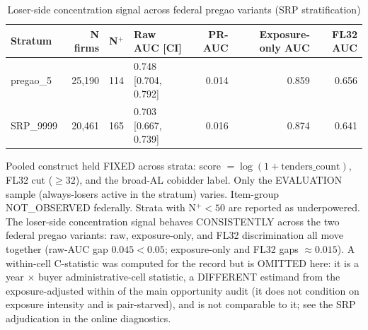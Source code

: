 \begin{table}[htbp]\centering
\caption{Loser-side concentration signal across federal pregao variants (SRP stratification)}
\label{tab:srp_stratified}
\begin{tabular}{lrrlrrr}\hline
Stratum & N firms & N$^+$ & Raw AUC [CI] & PR-AUC & Exposure-only AUC & FL32 AUC \\\hline
pregao\_5 & 25,190 & 114 & 0.748 [0.704, 0.792] & 0.014 & 0.859 & 0.656 \\
SRP\_9999 & 20,461 & 165 & 0.703 [0.667, 0.739] & 0.016 & 0.874 & 0.641 \\
\hline\end{tabular}
\begin{tablenotes}\footnotesize\item Pooled construct held FIXED across strata: score $=\log(1+\text{tenders\_count})$, FL32 cut ($\geq 32$), and the broad-AL cobidder label. Only the EVALUATION sample (always-losers active in the stratum) varies. Item-group NOT\_OBSERVED federally. Strata with N$^+<50$ are reported as underpowered. The loser-side concentration signal behaves CONSISTENTLY across the two federal pregao variants: raw, exposure-only, and FL32 discrimination all move together (raw-AUC gap $0.045 < 0.05$; exposure-only and FL32 gaps $\approx 0.015$). A within-cell C-statistic was computed for the record but is OMITTED here: it is a year $\times$ buyer administrative-cell statistic, a DIFFERENT estimand from the exposure-adjusted within of the main opportunity audit (it does not condition on exposure intensity and is pair-starved), and is not comparable to it; see the SRP adjudication in the online diagnostics.\end{tablenotes}
\end{table}
